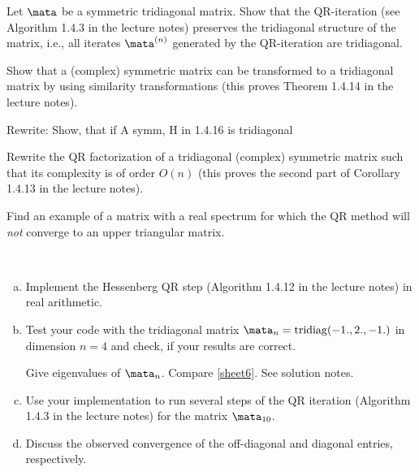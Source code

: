
\begin{Sheet}
  \label{sheet4}

  \begin{Problem}
    Let $\mata$ be a symmetric tridiagonal matrix. Show that the
    QR-iteration (see Algorithm 1.4.3 in the lecture notes) preserves
    the tridiagonal structure of the matrix, i.e., all iterates
    $\mata^{(n)}$ generated by the QR-iteration are tridiagonal.
  \end{Problem}

  \begin{Problem}
    Show that a (complex) symmetric matrix can be transformed to a
    tridiagonal matrix by using similarity transformations (this
    proves Theorem 1.4.14 in the lecture notes).
    \begin{todo}
      Rewrite: Show, that if A symm, H in 1.4.16 is tridiagonal
    \end{todo}
  \end{Problem}

  \begin{Problem}
    Rewrite the QR factorization of a tridiagonal (complex) symmetric
    matrix such that its complexity is of order $O(n)$ (this proves
    the second part of Corollary 1.4.13 in the lecture notes).
  \end{Problem}

  \begin{Problem}
    Find an example of a matrix with a real spectrum for which the QR
    method will \textit{not} converge to an upper triangular matrix.
  \end{Problem}

  \begin{Problem}[Programming]
    \hfill\\\vspace{-6ex}
    \begin{enumerate}[(a)]
    \item Implement the Hessenberg QR step (Algorithm 1.4.12 in the
      lecture notes) in real arithmetic.
    \item Test your code with the tridiagonal matrix
      $\mata_n=\operatorname{tridiag}(-1.,2.,-1.)$ in dimension $n=4$
      and check, if your results are correct.
      \begin{todo}
        Give eigenvalues of $\mata_n$. Compare \cref{sheet6}. See
        solution notes.
      \end{todo}
    \item Use your implementation to run several steps of the QR
      iteration (Algorithm 1.4.3 in the lecture notes) for the matrix
      $\mata_{10}$.
    \item Discuss the observed convergence of the off-diagonal and
      diagonal entries, respectively.
    \end{enumerate}
  \end{Problem}

\end{Sheet}


